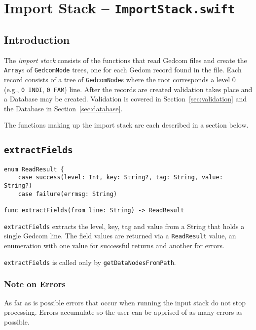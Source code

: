 \section{Import Stack -- \texttt{ImportStack.swift}}
%
%
\subsection{Introduction}
The \emph{import stack} consists of the functions that read Gedcom
files and create the \texttt{Array}s of \texttt{GedcomNode} trees,
one for each Gedom record found in the file.
Each record consists of a tree of
\texttt{GedcomNode}s
where the root corresponds a level 0 (e.g., \texttt{0 INDI},
\texttt{0 FAM}) line. After the records are created validation
takes place and a Database may be created. Validation is
covered in Section~\ref{sec:validation} and the Database
in Section~\ref{sec:database}.

The functions making up the import stack are each described
in a section below.

%
%

\subsection{\texttt{extractFields}}
\begin{verbatim}
enum ReadResult {
    case success(level: Int, key: String?, tag: String, value: String?)
    case failure(errmsg: String)

func extractFields(from line: String) -> ReadResult 
\end{verbatim}

\texttt{extractFields} extracts the level, key, tag and value from a
String that holds a single Gedcom line.
The field values are returned via a \texttt{ReadResult} value, an
enumeration with one value for successful returns and another for errors.

\texttt{extractFields} is called only by \texttt{getDataNodesFromPath}.
\subsubsection{Note on Errors}
As far as is possible errors that occur when running the input stack do not stop
 processing.
Errors accumulate so the user can be apprised of as many errors as possible.

